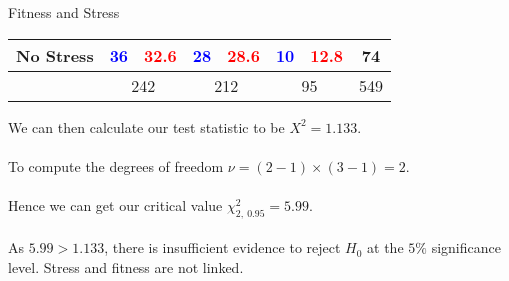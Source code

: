 \begin{examplebox}{Fitness and Stress}
\begin{center}
\begin{tabular}{l | c c c c c c | c}
		No Stress & \textcolor{blue}{36}             & \textcolor{red}{32.6}               & \textcolor{blue}{28}             & \textcolor{red}{28.6}  & \textcolor{blue}{10} & \textcolor{red}{12.8} & 74  \\
		\hline
		          & \multicolumn{2}{c}{242}          & \multicolumn{2}{c}{212}             & \multicolumn{2}{c}{95}           & 549                                                                         \\
	\end{tabular}
\end{center}
We can then calculate our test statistic to be $X^2 = 1.133$.
\\
\\ To compute the degrees of freedom $\nu = (2 - 1) \times (3 - 1) = 2$.
\\
\\ Hence we can get our critical value $\chi^2_{2, \ 0.95} = 5.99$.
\\
\\ As $5.99 > 1.133$, there is insufficient evidence to reject $H_0$ at the $5\%$ significance level. Stress and fitness are not linked.
\end{examplebox}


